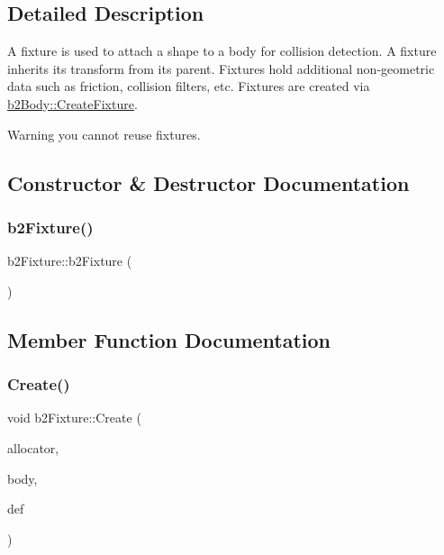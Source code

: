 \subsection{Detailed Description}
A fixture is used to attach a shape to a body for collision detection. A fixture inherits its transform from its parent. Fixtures hold additional non-\/geometric data such as friction, collision filters, etc. Fixtures are created via \mbox{\hyperlink{classb2_body_aa4892301e9b9d62ede5e93dad1743894}{b2\+Body\+::\+Create\+Fixture}}. \begin{DoxyWarning}{Warning}
you cannot reuse fixtures. 
\end{DoxyWarning}


\subsection{Constructor \& Destructor Documentation}
\mbox{\label{classb2_fixture_a02e11d3783af2168ac1cf8e9e9055c67}} 
\subsubsection{\texorpdfstring{b2Fixture()}{b2Fixture()}}
{\footnotesize\ttfamily b2\+Fixture\+::b2\+Fixture (\begin{DoxyParamCaption}{ }\end{DoxyParamCaption})\hspace{0.3cm}{\ttfamily [protected]}}



\subsection{Member Function Documentation}
\mbox{\label{classb2_fixture_a1f465f3656f098eebfcbc6edf7a9239a}} 
\subsubsection{\texorpdfstring{Create()}{Create()}}
{\footnotesize\ttfamily void b2\+Fixture\+::\+Create (\begin{DoxyParamCaption}\item[{\mbox{\hyperlink{classb2_block_allocator}{b2\+Block\+Allocator}} $\ast$}]{allocator,  }\item[{\mbox{\hyperlink{classb2_body}{b2\+Body}} $\ast$}]{body,  }\item[{const \mbox{\hyperlink{structb2_fixture_def}{b2\+Fixture\+Def}} $\ast$}]{def }\end{DoxyParamCaption})\hspace{0.3cm}{\ttfamily [protected]}}

